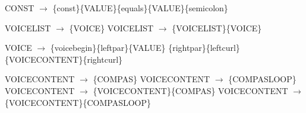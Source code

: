 CONST $\rightarrow$ \{const\}\{VALUE\}\{equals\}\{VALUE\}\{semicolon\}\newline

VOICELIST $\rightarrow$ \{VOICE\}\newline
VOICELIST $\rightarrow$ \{VOICELIST\}\{VOICE\}\newline

VOICE $\rightarrow$ \{voicebegin\}\{leftpar\}\{VALUE\} \{rightpar\}\{leftcurl\}\{VOICECONTENT\}\{rightcurl\}\newline

VOICECONTENT $\rightarrow$ \{COMPAS\}\newline
VOICECONTENT $\rightarrow$ \{COMPASLOOP\}\newline
VOICECONTENT $\rightarrow$ \{VOICECONTENT\}\{COMPAS\}\newline
VOICECONTENT $\rightarrow$ \{VOICECONTENT\}\{COMPASLOOP\}\newline

